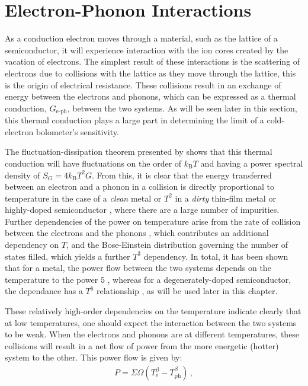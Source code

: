 \section{Electron-Phonon Interactions}\label{sec:eph}
As a conduction electron moves through a material, such as the lattice of a semiconductor, it will experience interaction with the ion cores created by the vacation of electrons. The simplest result of these interactions is the scattering of electrons due to collisions with the lattice as they move through the lattice, this is the origin of electrical resistance. These collisions result in an exchange of energy between the electrons and phonons, which can be expressed as a thermal conduction, $G_{\mathrm{e\mbox{-}ph}}$, between the two systems. As will be seen later in this section, this thermal conduction plays a large part in determining the limit of a cold-electron bolometer's sensitivity.
\par 
The fluctuation-dissipation theorem presented by \textcite{Nyquist1928b} shows that this thermal conduction will have fluctuations on the order of $k_{\mathrm{B}}T$ and having a power spectral density of $S_{G} = 4k_{\mathrm{B}}T^{2}G$. From this, it is clear that the energy transferred between an electron and a phonon in a collision is directly proportional to temperature in the case of a \textit{clean} metal or $T^{2}$ in a \textit{dirty} thin-film metal or highly-doped semiconductor , where there are a large number of impurities. Further dependencies of the power on temperature arise from the rate of collision between the electrons and the phonons \parencite[see][]{Ziman2001}, which contributes an additional dependency on $T$, and the Bose-Einstein distribution governing the number of states filled, which yields a further $T^{3}$ dependency. In total, it has been shown that for a metal, the power flow between the two systems depends on the temperature to the power $5$ \parencite{Ziman2001}, whereas for a degenerately-doped semiconductor, the dependance has a $T^{6}$ relationship \parencite{Prunnila2007}, as will be used later in this chapter.
\par 
These relatively high-order dependencies on the temperature indicate clearly that at low temperatures, one should expect the interaction between the two systems to be weak. When the electrons and phonons are at different temperatures, these collisions will result in a net flow of power from the more energetic (hotter) system to the other. This power flow is given by:
\begin{align}
P = \varSigma\varOmega\left(T_{\mathrm{e}}^{\beta} - T_{\mathrm{ph}}^{\beta}\right)\,,
\label{eqn:e-phPower}
\end{align}
